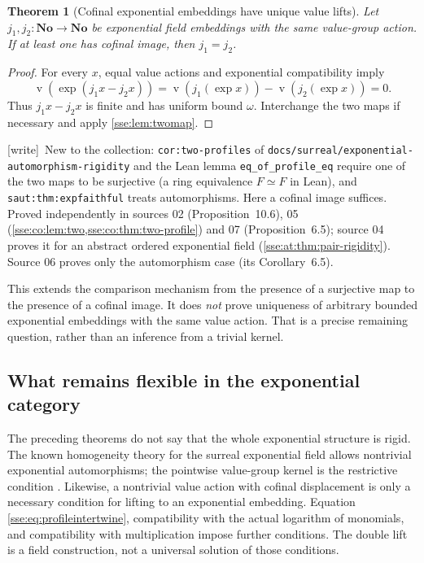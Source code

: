 \documentclass[11pt,a4paper]{article}
\numberwithin{equation}{section}
\theoremstyle{plain}
\newtheorem{theorem}{Theorem}[section]
\theoremstyle{definition}
\theoremstyle{remark}
\newcommand{\No}{\mathbf{No}}
\newcommand{\val}{\operatorname{v}}
\newcommand{\code}[1]{\texttt{\small #1}}
\newcommand{\lbl}[1]{\nolinkurl{#1}}%
\newcommand{\fn}[1]{\nolinkurl{#1}}%
\newcommand{\wtag}{\textup{\textsf{[write]}}}%
\newenvironment{wnote}{\par\smallskip\noindent\wtag\ }{\par\smallskip}
\begin{document}
\begin{theorem}[Cofinal exponential embeddings have unique value lifts]
\label{sse:thm:expunique}
Let $j_1,j_2:\No\to\No$ be exponential field embeddings with the same
value-group action. If at least one has cofinal image, then $j_1=j_2$.
\end{theorem}
\begin{proof}
For every $x$, equal value actions and exponential compatibility imply
\[
 \val(\exp(j_1x-j_2x))
 =\val(j_1(\exp x))-\val(j_2(\exp x))=0.
\]
Thus $j_1x-j_2x$ is finite and has uniform bound $\omega$.
Interchange the two maps if necessary and apply \cref{sse:lem:twomap}.
\end{proof}
\begin{wnote}New to the collection: \lbl{cor:two-profiles} of \fn{docs/surreal/exponential-automorphism-rigidity} and the Lean lemma \code{eq\_of\_profile\_eq} require one of the two maps to be surjective (a ring equivalence $F\simeq F$ in Lean), and \lbl{saut:thm:expfaithful} treats automorphisms. Here a cofinal image suffices. Proved independently in sources 02 (Proposition~10.6), 05 (\cref{sse:co:lem:two,sse:co:thm:two-profile}) and 07 (Proposition~6.5); source 04 proves it for an abstract ordered exponential field (\cref{sse:at:thm:pair-rigidity}). Source 06 proves only the automorphism case (its Corollary~6.5).\end{wnote}
This extends the comparison mechanism from the presence of a surjective
map to the presence of a cofinal image. It does \emph{not} prove
uniqueness of arbitrary bounded exponential embeddings with the same
value action. That is a precise remaining question, rather than an
inference from a trivial kernel.

\subsection{What remains flexible in the exponential category}
The preceding theorems do not say that the whole exponential structure is
rigid. The known homogeneity theory for the surreal exponential field
allows nontrivial exponential automorphisms; the pointwise value-group
kernel is the restrictive condition \cite{KKS,EhrlichKaplan}.
Likewise, a nontrivial value action with cofinal displacement is only a
necessary condition for lifting to an exponential embedding. Equation
\eqref{sse:eq:profileintertwine}, compatibility with the actual logarithm of
monomials, and compatibility with multiplication impose further conditions.
The double lift is a field construction, not a universal solution of
those conditions.
\end{document}
